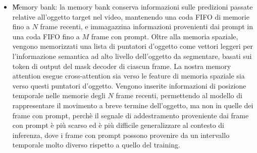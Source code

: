 \begin{itemize}
    \item \U{Memory bank}: la memory bank conserva informazioni sulle predizioni passate relative all'oggetto target nel video, mantenendo una coda FIFO di memorie fino a $N$ frame recenti, e immagazzina informazioni provenienti dai prompt in una coda FIFO fino a $M$ frame con prompt. Oltre alla memoria spaziale, vengono memorizzati una lista di puntatori d'oggetto come vettori leggeri per l'informazione semantica ad alto livello dell'oggetto da segmentare, basati sui token di output del mask decoder di ciascun frame. La nostra memory attention esegue cross-attention sia verso le feature di memoria spaziale sia verso questi puntatori d'oggetto. Vengono inserite informazioni di posizione temporale nelle memorie degli $N$ frame recenti, permettendo al modello di rappresentare il movimento a breve termine dell'oggetto, ma non in quelle dei frame con prompt, perchè il segnale di addestramento proveniente dai frame con prompt è più scarso ed è più difficile generalizzare al contesto di inferenza, dove i frame con prompt possono provenire da un intervallo temporale molto diverso rispetto a quello del training. \cite{sam2}
\end{itemize} 
